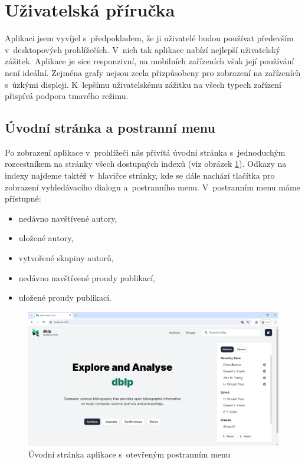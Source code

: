 \documentclass[
  biblatex,
  sourcecodes,
  glossaries,
  index
]{kidiplom}
\begin{document}
\newpage

\section{Uživatelská příručka}

Aplikaci jsem vyvíjel s~předpokladem, že ji uživatelé budou používat především v~desktopových prohlížečích. V~nich tak aplikace nabízí nejlepší uživatelský zážitek. Aplikace je sice responzivní, na mobilních zařízeních však její používání není ideální. Zejména grafy nejsou zcela přizpůsobeny pro zobrazení na zařízeních s~úzkými displeji. K~lepšímu uživatelskému zážitku na všech typech zařízení přispívá podpora tmavého režimu.

\subsection{Úvodní stránka a postranní menu}

Po zobrazení aplikace v~prohlížeči nás přivítá úvodní stránka s~jednoduchým rozcestníkem na stránky všech dostupných indexů (viz obrázek \ref{fig:uvodni_stranka}). Odkazy na indexy najdeme taktéž v~hlavičce stránky, kde se dále nachází tlačítka pro zobrazení vyhledávacího dialogu a~postranního menu. V~postranním menu máme přístupné:
\begin{itemize}
\item nedávno navštívené autory,
\item uložené autory,
\item vytvořené skupiny autorů,
\item nedávno navštívené proudy publikací,
\item uložené proudy publikací.
\end{itemize}

\begin{figure}[H]
\begin{center}
\includegraphics[width=\textwidth]{uvodni_stranka}
\caption{Úvodní stránka aplikace s~otevřeným postranním menu}\label{fig:uvodni_stranka}
\end{center}
\end{figure}
\end{document}
